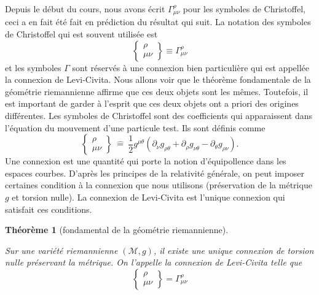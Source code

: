 \documentclass[a4paper,11pt]{report}
\theoremstyle{definition}
\theoremstyle{plain}
\newtheorem{thm}{Théorème}[chapter]
\theoremstyle{definition}
\theoremstyle{remark}
\newcommand{\M}{\mathscr{M}}
\newcommand{\p}{\partial}
\newcommand{\chris}[3]{\begin{Bmatrix}#1\\#2#3\end{Bmatrix}}
\begin{document}
                Depuis le début du cours, nous avons écrit $\Gamma^\rho_{\mu\nu}$ pour les symboles de Christoffel, ceci  a en fait été fait en prédiction du résultat qui suit. La notation des symboles de Christoffel qui est souvent utilisée est
                \begin{equation*}
                    \chris{\rho}{\mu}{\nu}\equiv
                    \Gamma^\rho_{\mu\nu}
                \end{equation*}
                et les symboles $\Gamma$ sont réservés à une connexion bien particulière qui est appellée la connexion de Levi-Civita. Nous allons voir que le théorème fondamentale de la géométrie riemannienne affirme que ces deux objets sont les mêmes. Toutefois, il est important de garder à l'esprit que ces deux objets ont a priori des origines différentes. Les symboles de Christoffel sont des coefficients qui apparaissent dans l'équation du mouvement d'une particule test. Ils sont définis comme
                \begin{equation}
                    \chris{\rho}{\mu}{\nu}~\hat{=}~
                    \frac{1}{2}g^{\mu\theta}\left( \p_\nu g_{\rho\theta}+\p_\rho g_{\nu\theta}-\p_\theta g_{\rho\nu} \right).
                \end{equation}
                Une connexion est une quantité qui porte la notion d'équipollence dans les espaces courbes. D'après les principes de la relativité générale, on peut imposer certaines condition à la connexion que nous utilisons (préservation de la métrique $g$ et torsion nulle). La connexion de Levi-Civita est l'unique connexion qui satisfait ces conditions.\\
            
                \begin{thm}[fondamental de la géométrie riemannienne]\begin{leftbar}
                    Sur une variété riemannienne $(\M,g)$, il existe une unique connexion de torsion nulle préservant la métrique. On l'appelle la \textit{connexion de Levi-Civita} telle que
                    \begin{equation}
                        \chris{\rho}{\mu}{\nu}=\Gamma^\rho_{\mu\nu}
                    \end{equation}
                \end{leftbar}\end{thm}
                
\end{document}
